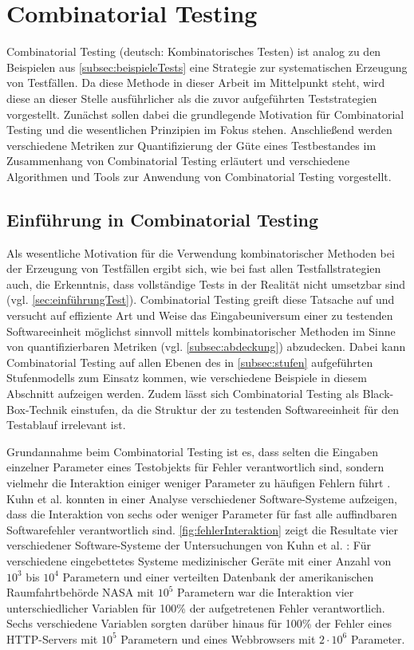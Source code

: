 \section{Combinatorial Testing}\label{sec:combinatorialTesting}

Combinatorial Testing (deutsch: Kombinatorisches Testen) ist analog zu den Beispielen aus \autoref{subsec:beispieleTests} eine Strategie zur systematischen Erzeugung von Testfällen. Da diese Methode in dieser Arbeit im Mittelpunkt steht, wird diese an dieser Stelle ausführlicher als die zuvor aufgeführten Teststrategien vorgestellt. Zunächst sollen dabei die grundlegende Motivation für Combinatorial Testing und die wesentlichen Prinzipien im Fokus stehen. Anschließend werden verschiedene Metriken zur Quantifizierung der Güte eines Testbestandes im Zusammenhang von Combinatorial Testing erläutert und verschiedene Algorithmen und Tools zur Anwendung von Combinatorial Testing vorgestellt.

\subsection{Einführung in Combinatorial Testing}\label{subsec:einführungCombinatorial}

Als wesentliche Motivation für die Verwendung kombinatorischer Methoden bei der Erzeugung von Testfällen ergibt sich, wie bei fast allen Testfallstrategien auch, die Erkenntnis, dass vollständige Tests in der Realität nicht umsetzbar sind (vgl. \autoref{sec:einführungTest}). Combinatorial Testing greift diese Tatsache auf und versucht auf effiziente Art und Weise das Eingabeuniversum einer zu testenden Softwareeinheit möglichst sinnvoll mittels kombinatorischer Methoden im Sinne von quantifizierbaren Metriken (vgl. \autoref{subsec:abdeckung}) abzudecken. Dabei kann Combinatorial Testing auf allen Ebenen des in \autoref{subsec:stufen} aufgeführten Stufenmodells zum Einsatz kommen, wie verschiedene Beispiele in diesem Abschnitt aufzeigen werden. Zudem lässt sich Combinatorial Testing als Black-Box-Technik einstufen, da die Struktur der zu testenden Softwareeinheit für den Testablauf irrelevant ist.

Grundannahme beim Combinatorial Testing ist es, dass selten die Eingaben einzelner Parameter eines Testobjekts für Fehler verantwortlich sind, sondern vielmehr die Interaktion einiger weniger Parameter zu häufigen Fehlern führt \cite{kuhn2010practical}. Kuhn et al. \cite{kuhn2004error} konnten in einer Analyse verschiedener Software-Systeme aufzeigen, dass die Interaktion von sechs oder weniger Parameter für fast alle auffindbaren Softwarefehler verantwortlich sind. \autoref{fig:fehlerInteraktion} zeigt die Resultate vier verschiedener Software-Systeme der Untersuchungen von Kuhn et al. \cite{kuhn2004error}: Für verschiedene eingebettetes Systeme medizinischer Geräte mit einer Anzahl von $10^3$ bis $10^4$ Parametern und einer verteilten Datenbank der amerikanischen Raumfahrtbehörde NASA mit $10^5$ Parametern war die Interaktion vier unterschiedlicher Variablen für 100\% der aufgetretenen Fehler verantwortlich. Sechs verschiedene Variablen sorgten darüber hinaus für 100\% der Fehler eines HTTP-Servers mit $10^5$ Parametern und eines Webbrowsers mit $2 \cdot 10^6$ Parameter.

